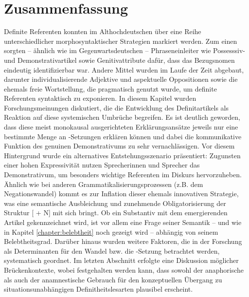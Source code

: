 \section{Zusammenfassung}
Definite Referenten konnten im Althochdeutschen über eine Reihe unterschiedlicher morphosyntaktischer Strategien markiert werden. Zum einen sorgten -- ähnlich wie im Gegenwartsdeutschen -- Phraseneinleiter wie Possesssiv- und Demonstrativartikel sowie Genitivattribute dafür, dass das Bezugsnomen eindeutig identifizierbar war. Andere Mittel wurden im Laufe der Zeit abgebaut, darunter individualisierende Adjektive und aspektuelle Oppositionen sowie die ehemals freie Wortstellung, die pragmatisch genutzt wurde, um definite Referenten syntaktisch zu exponieren. In diesem Kapitel wurden Forschungsmeinungen diskutiert, die die Entwicklung des Definitartikels als Reaktion auf diese systemischen Umbrüche begreifen. Es ist deutlich geworden, dass diese meist monokausal ausgerichteten Erklärungsansätze jeweils nur eine bestimmte Menge an -Setzungen erklären können und dabei die kommunikative Funktion des genuinen Demonstrativums zu sehr vernachlässigen. Vor diesem Hintergrund wurde ein alternatives Entstehungsszenario präsentiert: Zugunsten einer hohen Expressivität nutzen Sprecherinnen und Sprecher das Demonstrativum, um besonders wichtige Referenten im Diskurs hervorzuheben. Ähnlich wie bei anderen Grammatikalisierungsprozessen (z.B. dem Negationswandel) kommt es zur Inflation dieser ehemals innovativen Strategie, was eine semantische Ausbleichung und zunehmende Obligatorisierung der Struktur [ + N] mit sich bringt. Ob ein Substantiv mit dem emergierenden Artikel gekennzeichnet wird, ist vor allem eine Frage seiner Semantik -- und wie in Kapitel \ref{chapter:belebtheit} noch gezeigt wird -- abhängig von seinem Belebtheitsgrad. Darüber hinaus wurden weitere  Faktoren, die in der Forschung als Determinanten für den Wandel bzw. die -Setzung betrachtet werden, systematisch geordnet. Im letzten Abschnitt erfolgte eine Diskussion möglicher Brückenkontexte, wobei festgehalten werden kann, dass sowohl der anaphorische als auch der anamnestische Gebrauch für den konzeptuellen Übergang zu situationsunabhängigen Definitheitslesarten plausibel erscheint. 
